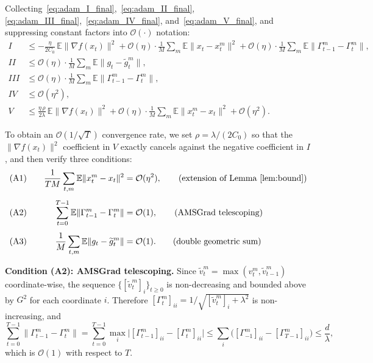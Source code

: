\documentclass{article}
\begin{document}
Collecting~\eqref{eq:adam_I_final},~\eqref{eq:adam_II_final},
\eqref{eq:adam_III_final},~\eqref{eq:adam_IV_final},
and~\eqref{eq:adam_V_final}, and suppressing constant factors into
$\mathcal{O}(\cdot)$ notation:
\begin{align}
I  &\leq -\frac{\eta}{2C_0}\,\mathbb{E}\|\nabla f(x_t)\|^2
   + \mathcal{O}(\eta)\cdot\frac{1}{M}\sum_m\mathbb{E}\|x_t - x_t^m\|^2
   + \mathcal{O}(\eta)\cdot\frac{1}{M}\sum_m
   \mathbb{E}\|\Gamma_{t-1}^m - \Gamma_t^m\|,
\label{eq:adam_sum_I} \\[4pt]
II &\leq \mathcal{O}(\eta)\cdot\frac{1}{M}\sum_m
   \mathbb{E}\|g_t - \widetilde{g}_t^m\|,
\label{eq:adam_sum_II} \\[4pt]
III &\leq \mathcal{O}(\eta)\cdot\frac{1}{M}\sum_m
   \mathbb{E}\|\Gamma_{t-1}^m - \Gamma_t^m\|,
\label{eq:adam_sum_III} \\[4pt]
IV &\leq \mathcal{O}(\eta^2),
\label{eq:adam_sum_IV} \\[4pt]
V  &\leq \frac{\eta\,\rho}{2\lambda}\,\mathbb{E}\|\nabla f(x_t)\|^2
   + \mathcal{O}(\eta)\cdot\frac{1}{M}\sum_m\mathbb{E}\|x_t^m - x_t\|^2
   + \mathcal{O}(\eta^2).
\label{eq:adam_sum_V}
\end{align}

To obtain an $\mathcal{O}(1/\sqrt{T})$ convergence rate, we set
$\rho = \lambda/(2C_0)$ so that the $\|\nabla f(x_t)\|^2$ coefficient in
$V$ exactly cancels against the negative coefficient in $I$, and then verify
three conditions:
\begin{alignat}{2}
&\text{(A1)}\quad&
\frac{1}{TM}\sum_{t,m}\mathbb{E}\|x_t^m - x_t\|^2
&= \mathcal{O}(\eta^2),
\qquad\text{(extension of Lemma~\ref{lem:bound})}
\label{eq:adam_cond_A1} \\[4pt]
&\text{(A2)}\quad&
\sum_{t=0}^{T-1}\mathbb{E}\|\Gamma_{t-1}^m - \Gamma_t^m\|
&= \mathcal{O}(1),
\qquad\text{(AMSGrad telescoping)}
\label{eq:adam_cond_A2} \\[4pt]
&\text{(A3)}\quad&
\frac{1}{M}\sum_{t,m}\mathbb{E}\|g_t - \widetilde{g}_t^m\|
&= \mathcal{O}(1).
\qquad\text{(double geometric sum)}
\label{eq:adam_cond_A3}
\end{alignat}

\medskip
\noindent\textbf{Condition (A2): AMSGrad telescoping.}
Since $\tilde{v}_t^m = \max(v_t^m, \tilde{v}_{t-1}^m)$ coordinate-wise,
the sequence $\{[\tilde{v}_t^m]_i\}_{t \geq 0}$ is non-decreasing and bounded
above by $G^2$ for each coordinate $i$. Therefore
$[\Gamma_t^m]_{ii} = 1/\sqrt{[\tilde{v}_t^m]_i + \lambda^2}$ is non-increasing,
and
\begin{equation}
\sum_{t=0}^{T-1}\|\Gamma_{t-1}^m - \Gamma_t^m\|
= \sum_{t=0}^{T-1}\max_i\bigl|[\Gamma_{t-1}^m]_{ii} - [\Gamma_t^m]_{ii}\bigr|
\leq \sum_i\bigl([\Gamma_{-1}^m]_{ii} - [\Gamma_{T-1}^m]_{ii}\bigr)
\leq \frac{d}{\lambda},
\label{eq:adam_AMSGrad_telescope}
\end{equation}
which is $\mathcal{O}(1)$ with respect to $T$.
\end{document}
